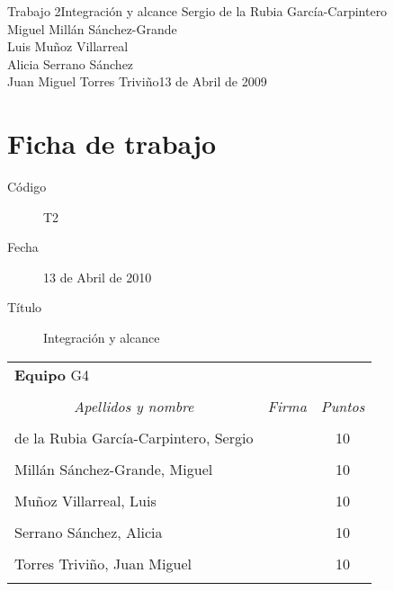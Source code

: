 \documentclass[11pt,a4paper,spanish,twoside]{report}
\begin{document}


{Trabajo 2}{Integración y alcance}
{Sergio de la Rubia García-Carpintero\\Miguel Millán Sánchez-Grande\\
  Luis Muñoz Villarreal\\Alicia Serrano Sánchez\\
  Juan Miguel Torres Triviño}{13 de Abril de 2009}


\chapter*{Ficha de trabajo}
\begin{description}
\item[Código] T2
\item[Fecha] 13 de Abril de 2010
\item[Título] Integración y alcance
\end{description}

\begin{table}[!ht]
  \centering
  \begin{tabular}{lp{5cm}c}
    \multicolumn{3}{l}{\Large \textbf{Equipo} G4} \\ \\
    \multicolumn{1}{c}{\emph{Apellidos y nombre}} & 
    \multicolumn{1}{c}{\emph{Firma}} & \emph{Puntos} \\
    \hline \\
    de la Rubia García-Carpintero, Sergio & & 10 \\ \\
    Millán Sánchez-Grande, Miguel         & & 10 \\ \\
    Muñoz Villarreal, Luis                & & 10 \\ \\
    Serrano Sánchez, Alicia               & & 10 \\ \\
    Torres Triviño, Juan Miguel           & & 10 \\ \\
    \hline
  \end{tabular}
\end{table}
\end{document}
